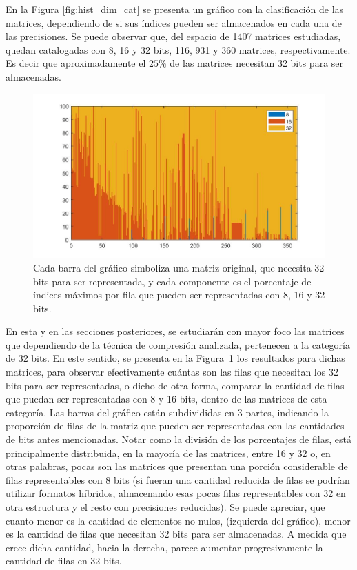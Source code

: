 En la Figura \ref{fig:hist_dim_cat} se presenta un gráfico con la clasificación de las matrices, dependiendo de si sus índices pueden ser almacenados en cada una de las precisiones. Se puede observar que, del espacio de 1407 matrices estudiadas, quedan catalogadas con 8, 16 y 32 bits, 116, 931 y 360 matrices, respectivamente. Es decir que aproximadamente el $25\%$ de las matrices necesitan 32 bits para ser almacenadas. 

\begin{figure}[h]
    \centering
    \includegraphics[width=.7\textwidth]{imagenes/chap4/index_bar_row_porc_per_cat_32.jpg}
    \caption{Cada barra del gráfico simboliza una matriz original, que necesita 32 bits para ser representada, y cada componente es el porcentaje de índices máximos por fila que pueden ser representadas con 8, 16 y 32 bits.}
    \label{fig:index_bar_row_porc_per_cat_32}
\end{figure}

En esta y en las secciones posteriores, se estudiarán con mayor foco las matrices que dependiendo de la técnica de compresión analizada, pertenecen a la categoría de 32 bits.  En este sentido, se presenta en la Figura~\ref{fig:index_bar_row_porc_per_cat_32} los resultados para dichas matrices, para observar efectivamente cuántas son las filas que necesitan los 32 bits para ser representadas, o dicho de otra forma, comparar la cantidad de filas que puedan ser representadas con 8 y 16 bits, dentro de las matrices de esta categoría. 
Las barras del gráfico están subdivididas en 3 partes, 
indicando la proporción de filas de la matriz que pueden ser representadas con las cantidades de bits antes mencionadas. Notar como la división de los porcentajes de filas, está principalmente distribuida, en la mayoría de las matrices, entre 16 y 32 o, en otras palabras, pocas son las matrices que presentan una porción considerable de filas representables con 8 bits (si fueran una cantidad reducida de filas se podrían utilizar formatos híbridos, almacenando esas pocas filas representables con 32 en otra estructura y el resto con precisiones reducidas). Se puede apreciar, que cuanto menor es la cantidad de elementos no nulos, (izquierda del gráfico), menor es la cantidad de filas que necesitan 32 bits para ser almacenadas. A medida que crece dicha cantidad, hacia la derecha, parece aumentar progresivamente la cantidad de filas en 32 bits.



